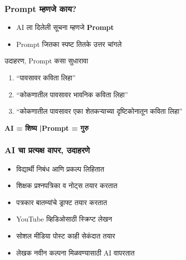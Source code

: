 \begin{frame}[fragile]\frametitle{Prompt म्हणजे काय?}

\begin{itemize}
\item AI ला दिलेली सूचना म्हणजे \textbf{Prompt}
\item Prompt जितका स्पष्ट तितके उत्तर चांगले
\end{itemize}

\vspace{0.2cm}
\begin{block}{उदाहरण, Prompt कसा सुधारावा}
\begin{enumerate}
\item ``पावसावर कविता लिहा''
\item ``कोकणातील पावसावर भावनिक कविता लिहा''
\item ``कोकणातील पावसावर एका शेतकऱ्याच्या दृष्टिकोनातून कविता लिहा''
\end{enumerate}
\end{block}

\vspace{0.2cm}
\textbf{AI = शिष्य \quad|\quad Prompt = गुरु}

\end{frame}

\begin{frame}[fragile]\frametitle{AI चा प्रत्यक्ष वापर, उदाहरणे}

\begin{itemize}
\item विद्यार्थी निबंध आणि प्रकल्प लिहितात
\item शिक्षक प्रश्नपत्रिका व नोट्स तयार करतात
\item पत्रकार बातम्यांचे ड्राफ्ट तयार करतात
\item YouTube व्हिडिओसाठी स्क्रिप्ट लेखन
\item सोशल मीडिया पोस्ट काही सेकंदात तयार
\item लेखक नवीन कल्पना मिळवण्यासाठी AI वापरतात
\end{itemize}

\end{frame}


